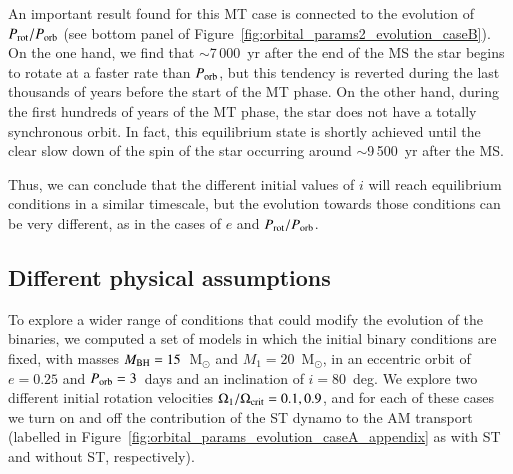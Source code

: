 \documentclass{aa}
\begin{document}
An important result found for this MT case is connected to the evolution of $P_{\rm rot}/P_{\rm orb}$ (see bottom panel of
Figure~\ref{fig:orbital_params2_evolution_caseB}). On the one hand, we find that $\sim$7\,000~yr after the end of the MS the star begins to
rotate at a faster rate than $P_{\rm orb}$, but this tendency is reverted during the last thousands of years before the start of the MT
phase. On the other hand, during the first hundreds of years of the MT phase, the star does not have a totally synchronous orbit. In fact,
this equilibrium state is shortly achieved until the clear slow down of the spin of the star occurring around $\sim$9\,500~yr after the MS.

Thus, we can conclude that the different initial values of $i$ will reach equilibrium conditions in a similar timescale, but the evolution
towards those conditions can be very different, as in the cases of $e$ and $P_{\rm rot}/P_{\rm orb}$.

\subsection{Different physical assumptions}

To explore a wider range of conditions that could modify the evolution of the binaries, we computed a set of models in which the initial
binary conditions are fixed, with masses $M_{\rm BH} = 15$~M$_\odot$ and $M_1 = 20$~M$_\odot$, in an eccentric orbit of $e = 0.25$ and
$P_{\rm orb} = 3$~days and an inclination of $i = 80$~deg. We explore two different initial rotation velocities
$\Omega_1 / \Omega_{\rm crit} = 0.1, 0.9$, and for each of these cases we turn on and off the contribution of the ST dynamo to the AM
transport (labelled in Figure~\ref{fig:orbital_params_evolution_caseA_appendix} as with ST and without ST, respectively).
\end{document}
